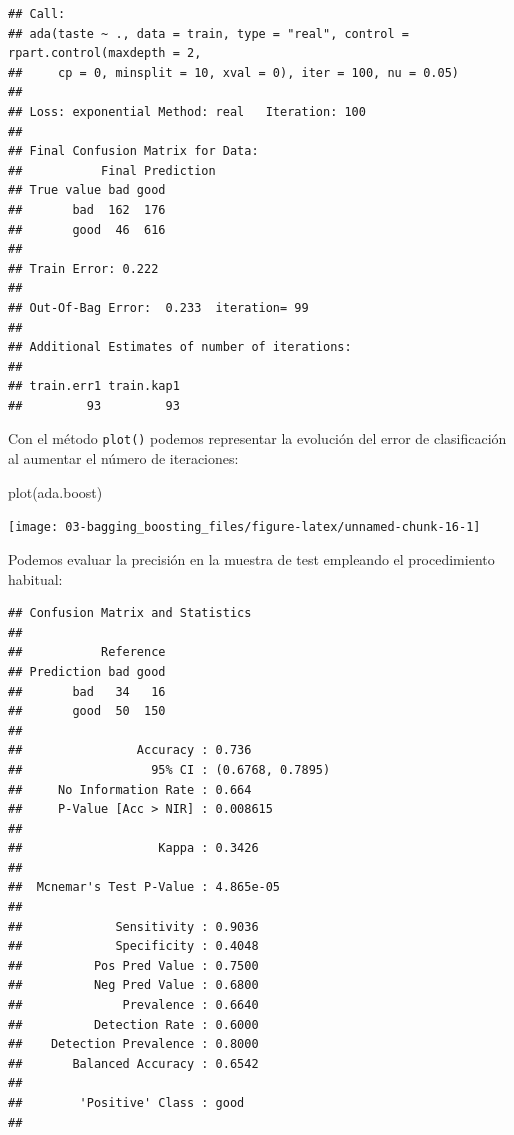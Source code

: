 \documentclass[
]{book}
\newenvironment{Shaded}{\begin{snugshade}}{\end{snugshade}}
\newcommand{\AttributeTok}[1]{\textcolor[rgb]{0.77,0.63,0.00}{#1}}
\newcommand{\FunctionTok}[1]{\textcolor[rgb]{0.00,0.00,0.00}{#1}}
\newcommand{\NormalTok}[1]{#1}
\newcommand{\OtherTok}[1]{\textcolor[rgb]{0.56,0.35,0.01}{#1}}
\newcommand{\SpecialCharTok}[1]{\textcolor[rgb]{0.00,0.00,0.00}{#1}}
\newcommand{\StringTok}[1]{\textcolor[rgb]{0.31,0.60,0.02}{#1}}
\theoremstyle{break}
\theoremstyle{definition}
\theoremstyle{definition}
\theoremstyle{definition}
\theoremstyle{definition}
\theoremstyle{remark}
\begin{document}
\begin{verbatim}
## Call:
## ada(taste ~ ., data = train, type = "real", control = rpart.control(maxdepth = 2, 
##     cp = 0, minsplit = 10, xval = 0), iter = 100, nu = 0.05)
## 
## Loss: exponential Method: real   Iteration: 100 
## 
## Final Confusion Matrix for Data:
##           Final Prediction
## True value bad good
##       bad  162  176
##       good  46  616
## 
## Train Error: 0.222 
## 
## Out-Of-Bag Error:  0.233  iteration= 99 
## 
## Additional Estimates of number of iterations:
## 
## train.err1 train.kap1 
##         93         93
\end{verbatim}

Con el método \texttt{plot()} podemos representar la evolución del error de clasificación al aumentar el número de iteraciones:

\begin{Shaded}
\begin{Highlighting}[]
\FunctionTok{plot}\NormalTok{(ada.boost)}
\end{Highlighting}
\end{Shaded}

\begin{center}\texttt{[image: 03-bagging\_boosting\_files/figure-latex/unnamed-chunk-16-1]} \end{center}

Podemos evaluar la precisión en la muestra de test empleando el procedimiento habitual:

\begin{Shaded}
\end{Shaded}

\begin{verbatim}
## Confusion Matrix and Statistics
## 
##           Reference
## Prediction bad good
##       bad   34   16
##       good  50  150
##                                           
##                Accuracy : 0.736           
##                  95% CI : (0.6768, 0.7895)
##     No Information Rate : 0.664           
##     P-Value [Acc > NIR] : 0.008615        
##                                           
##                   Kappa : 0.3426          
##                                           
##  Mcnemar's Test P-Value : 4.865e-05       
##                                           
##             Sensitivity : 0.9036          
##             Specificity : 0.4048          
##          Pos Pred Value : 0.7500          
##          Neg Pred Value : 0.6800          
##              Prevalence : 0.6640          
##          Detection Rate : 0.6000          
##    Detection Prevalence : 0.8000          
##       Balanced Accuracy : 0.6542          
##                                           
##        'Positive' Class : good            
## 
\end{verbatim}
\end{document}
